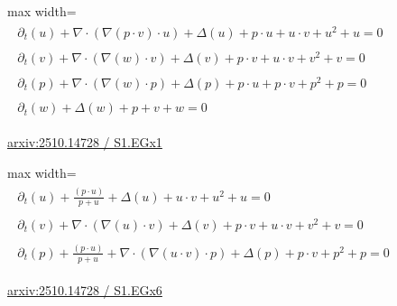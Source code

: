 \documentclass[10pt,a4paper]{article}
\begin{document}
\begin{minipage}{\linewidth}
\begin{center}\begin{adjustbox}{max width=\linewidth}$\displaystyle\begin{gathered}\begin{gathered}\partial_{t}(u)+\nabla\cdot(\nabla(p\cdot v)\cdot u)+\Delta(u)+p\cdot u+u\cdot v+u^{2}+u=0\end{gathered}\\[5pt]\begin{gathered}\partial_{t}(v)+\nabla\cdot(\nabla(w)\cdot v)+\Delta(v)+p\cdot v+u\cdot v+v^{2}+v=0\end{gathered}\\[5pt]\begin{gathered}\partial_{t}(p)+\nabla\cdot(\nabla(w)\cdot p)+\Delta(p)+p\cdot u+p\cdot v+p^{2}+p=0\end{gathered}\\[5pt]\begin{gathered}\partial_{t}(w)+\Delta(w)+p+v+w=0\end{gathered}\end{gathered}$\end{adjustbox}\end{center}
{\small \href{https://arxiv.org/html/2510.14728#S1.EGx1}{arxiv:2510.14728 / S1.EGx1}}\par
\end{minipage}\par\vspace{7mm}

\begin{minipage}{\linewidth}
\begin{center}\begin{adjustbox}{max width=\linewidth}$\displaystyle\begin{gathered}\begin{gathered}\partial_{t}(u)+\frac{(p\cdot u)}{p+u}+\Delta(u)+u\cdot v+u^{2}+u=0\end{gathered}\\[5pt]\begin{gathered}\partial_{t}(v)+\nabla\cdot(\nabla(u)\cdot v)+\Delta(v)+p\cdot v+u\cdot v+v^{2}+v=0\end{gathered}\\[5pt]\begin{gathered}\partial_{t}(p)+\frac{(p\cdot u)}{p+u}+\nabla\cdot(\nabla(u\cdot v)\cdot p)+\Delta(p)+p\cdot v+p^{2}+p=0\end{gathered}\end{gathered}$\end{adjustbox}\end{center}
{\small \href{https://arxiv.org/html/2510.14728#S1.EGx6}{arxiv:2510.14728 / S1.EGx6}}\par
\end{minipage}\par\vspace{7mm}
\end{document}
